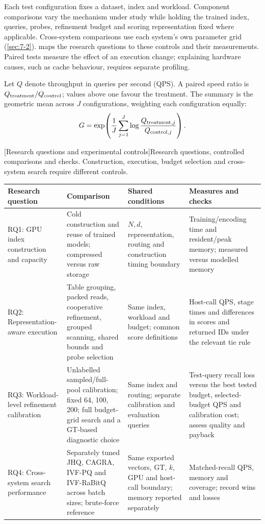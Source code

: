 Each test configuration fixes a dataset, index and
workload. Component comparisons vary the mechanism under study while
holding the trained index, queries, probes, refinement budget and scoring
representation fixed where applicable. Cross-system comparisons use each
system's own parameter grid (\cref{sec:7-2}).  maps the
research questions to these controls and their measurements. Paired tests
measure the effect of an execution change; explaining hardware causes,
such as cache behaviour, requires separate profiling.

Let $Q$ denote throughput in queries per second (QPS). A paired speed
ratio is $Q_{\rm treatment}/Q_{\rm control}$; values above one favour
the treatment. The summary is the geometric mean across $J$ configurations,
weighting each configuration equally:
\[
 G=\exp\!\left(\frac1J\sum_{j=1}^{J}
 \log\frac{Q_{{\rm treatment},j}}{Q_{{\rm control},j}}\right).
\]

\par\medskip\noindent\begin{minipage}{\linewidth}
\centering\captionsetup{hypcap=false}
[Research questions and experimental controls]{Research questions, controlled comparisons and checks. Construction,
execution, budget selection and cross-system search require different controls.}
\label{tab:3-design}
\footnotesize\setlength{\tabcolsep}{3pt}
\begin{tabularx}{\linewidth}{@{}>{\raggedright\arraybackslash}p{.19\linewidth}*{3}{>{\raggedright\arraybackslash}X}@{}}
\toprule
Research question & Comparison & Shared conditions & Measures and checks \\
\midrule
RQ1: GPU index construction and capacity & Cold construction and reuse of trained models; compressed versus raw storage
& $N,d$, representation, routing and construction timing boundary
& Training/encoding time and resident/peak memory; measured versus modelled memory \\
RQ2: Representation-aware execution & Table grouping, packed reads, cooperative refinement, grouped scanning, shared bounds and probe selection
& Same index, workload and budget; common score definitions
& Host-call QPS, stage times and differences in scores and returned IDs under the relevant tie rule \\
RQ3: Workload-level refinement calibration & Unlabelled sampled/full-pool calibration; fixed 64, 100, 200; full budget-grid search and a GT-based diagnostic choice
& Same index and routing; separate calibration and evaluation queries
& Test-query recall loss versus the best tested budget, selected-budget QPS and calibration cost; assess quality and payback \\
RQ4: Cross-system search performance & Separately tuned JHQ, CAGRA, IVF-PQ and IVF-RaBitQ across batch sizes; brute-force reference
& Same exported vectors, GT, $k$, GPU and host-call boundary; memory reported separately
& Matched-recall QPS, memory and coverage; record wins and losses \\
\bottomrule
\end{tabularx}
\end{minipage}\par\medskip

